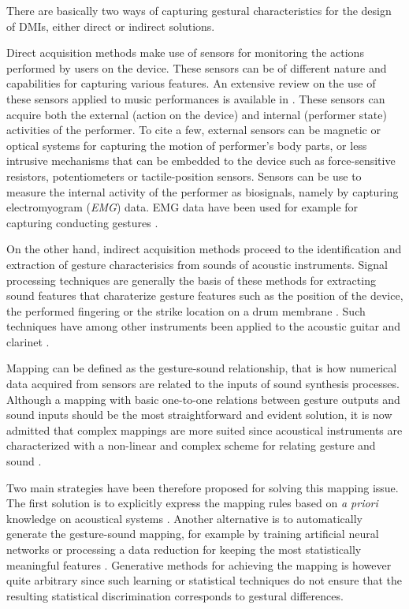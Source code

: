{{					
					\label{subsubsubsec:CM_Control_GC_GA_D}

There are basically two ways of capturing gestural characteristics for the design of DMIs, either direct or indirect solutions.

Direct acquisition methods make use of sensors for monitoring the actions performed by users on the device. These sensors can be of different nature and capabilities for capturing various features. An extensive review on the use of these sensors applied to music performances is available in . These sensors can acquire both the external (action on the device) and internal (performer state) activities of the performer. To cite a few, external sensors can be magnetic or optical systems  for capturing the motion of performer's body parts, or less intrusive mechanisms that can be embedded to the device such as force-sensitive resistors, potentiometers or tactile-position sensors. Sensors can be use to measure the internal activity of the performer as biosignals, namely by capturing electromyogram (\emph{EMG}) data. EMG data have been used for example for capturing conducting gestures .

On the other hand, indirect acquisition methods proceed to the identification and extraction of gesture characterisics from sounds of acoustic instruments. Signal processing techniques are generally the basis of these methods for extracting sound features that charaterize gesture features such as the position of the device, the performed fingering or the strike location on a drum membrane . Such techniques have among other instruments been applied to the acoustic guitar  and clarinet .


					\label{subsubsubsec:CM_Control_GC_GA_M}

Mapping can be defined as the gesture-sound relationship, that is how numerical data acquired from sensors are related to the inputs of sound synthesis processes. Although a mapping with basic one-to-one relations between gesture outputs and sound inputs should be the most straightforward and evident solution, it is now admitted that complex mappings are more suited since acoustical instruments are characterized with a non-linear and complex scheme for relating gesture and sound .

Two main strategies have been therefore proposed for solving this mapping issue. The first solution is to explicitly express the mapping rules based on \emph{a priori} knowledge on acoustical systems . Another alternative is to automatically generate the gesture-sound mapping, for example by training artificial neural networks  or processing a data reduction for keeping the most statistically meaningful features . Generative methods for achieving the mapping is however quite arbitrary since such learning or statistical techniques do not ensure that the resulting statistical discrimination corresponds to gestural differences.

}}
